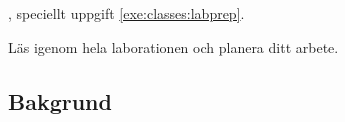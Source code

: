 

\Lab{\LabWeekFIVE}

\begin{Goals}

\end{Goals}

\begin{Preparations}
\item {}, speciellt uppgift \ref{exe:classes:labprep}.
\item Läs igenom hela laborationen och planera ditt arbete.
\end{Preparations}

\subsection{Bakgrund}

